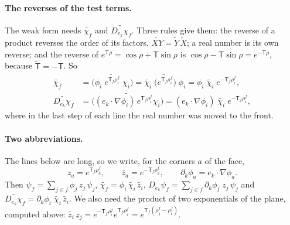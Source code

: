 \paragraph{The reverses of the test terms.} The weak form needs $\widetilde{\chi_f}$ and $\widetilde{D_{e_k}\chi_f}$. Three rules give them: the reverse of a product reverses the order of its factors, $\widetilde{XY} = \widetilde Y\,\widetilde X$; a real number is its own reverse; and the reverse of $e^{\mathsf T\rho} = \cos\rho + \mathsf T\sin\rho$ is $\cos\rho - \mathsf T\sin\rho = e^{-\mathsf T\rho}$, because $\widetilde{\mathsf T} = -\mathsf T$. So
\begin{align*}
\widetilde{\chi_f} &= \widetilde{\big(\phi_i\; e^{\mathsf T_f\rho_i^f}\;\chi_i\big)} = \widetilde{\chi_i}\;\widetilde{\big(e^{\mathsf T_f\rho_i^f}\big)}\;\phi_i = \phi_i\;\widetilde{\chi_i}\; e^{-\mathsf T_f\rho_i^f} , \\
\widetilde{D_{e_k}\chi_f} &= \widetilde{\big((e_k\cdot\nabla\phi_i)\, e^{\mathsf T_f\rho_i^f}\chi_i\big)} = (e_k\cdot\nabla\phi_i)\;\widetilde{\chi_i}\; e^{-\mathsf T_f\rho_i^f} ,
\end{align*}
where in the last step of each line the real number was moved to the front.

\paragraph{Two abbreviations.} The lines below are long, so we write, for the corners $a$ of the face,
\begin{equation*}
z_a = e^{\mathsf T_f\rho_a^f}, \qquad \widetilde{z_a} = e^{-\mathsf T_f\rho_a^f}, \qquad \partial_k\phi_a = e_k\cdot\nabla\phi_a .
\end{equation*}
Then $\psi_f = \sum_{j\in f}\phi_j\, z_j\,\psi_j$, $\widetilde{\chi_f} = \phi_i\,\widetilde{\chi_i}\,\widetilde{z_i}$, $D_{e_k}\psi_f = \sum_{j\in f}\partial_k\phi_j\; z_j\,\psi_j$ and $\widetilde{D_{e_k}\chi_f} = \partial_k\phi_i\;\widetilde{\chi_i}\,\widetilde{z_i}$. We also need the product of two exponentials of the plane, computed above: $\widetilde{z_i}\, z_j = e^{-\mathsf T_f\rho_i^f}e^{\mathsf T_f\rho_j^f} = e^{\mathsf T_f(\rho_j^f - \rho_i^f)}$.

